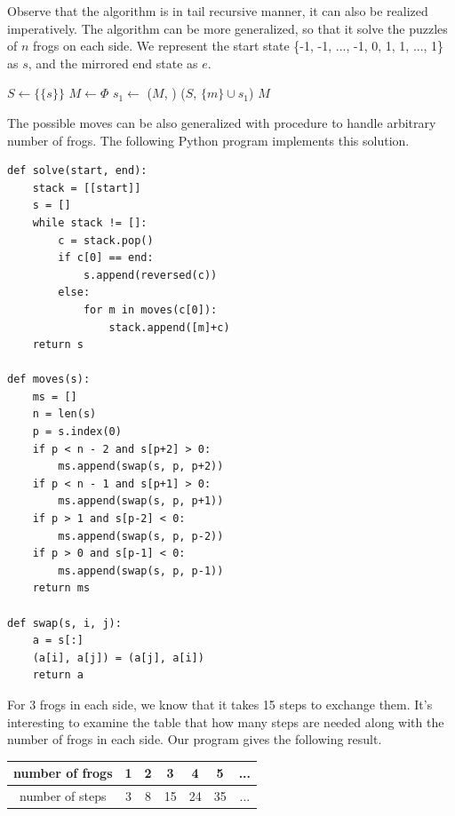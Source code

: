 \documentclass[UTF8]{article}
\begin{document}
Observe that the algorithm is in tail recursive manner, it can also be realized imperatively.
The algorithm can be more generalized, so that it
solve the puzzles of $n$ frogs on each side. We represent the start
state \{-1, -1, ..., -1, 0, 1, 1, ..., 1\} as $s$, and the mirrored end state as $e$.

\begin{algorithmic}[1]
  \State $S \gets \{\{s\}\}$
  \State $M \gets \Phi$
    \State $s_1 \gets$ 
      \State {}($M$, )
    \Else
        \State {}($S$, $\{m\} \cup s_1$)
      \EndFor
    \EndIf
  \EndWhile
  \State \Return $M$
\EndFunction
\end{algorithmic}

The possible moves can be also generalized with procedure  to handle
arbitrary number of frogs. The following
Python program implements this solution.

\lstset{language=Python}
\begin{lstlisting}
def solve(start, end):
    stack = [[start]]
    s = []
    while stack != []:
        c = stack.pop()
        if c[0] == end:
            s.append(reversed(c))
        else:
            for m in moves(c[0]):
                stack.append([m]+c)
    return s

def moves(s):
    ms = []
    n = len(s)
    p = s.index(0)
    if p < n - 2 and s[p+2] > 0:
        ms.append(swap(s, p, p+2))
    if p < n - 1 and s[p+1] > 0:
        ms.append(swap(s, p, p+1))
    if p > 1 and s[p-2] < 0:
        ms.append(swap(s, p, p-2))
    if p > 0 and s[p-1] < 0:
        ms.append(swap(s, p, p-1))
    return ms

def swap(s, i, j):
    a = s[:]
    (a[i], a[j]) = (a[j], a[i])
    return a
\end{lstlisting}

For 3 frogs in each side, we know that it takes 15 steps to exchange them.
It's interesting to examine the table that how many steps are needed
along with the number of frogs in each side. Our program
gives the following result.

\begin{tabular}{c|c|c|c|c|c|c}
number of frogs & 1 & 2 & 3  & 4  & 5 & ... \\
\hline
number of steps & 3 & 8 & 15 & 24 & 35 & ...
\end{tabular}
\end{document}
